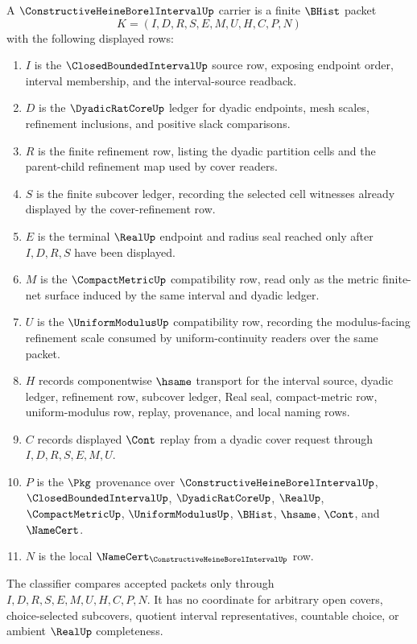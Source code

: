 \begin{definition}
\label{def:constructive-heine-borel-interval-carrier}
A $\ConstructiveHeineBorelIntervalUp$ carrier is a finite $\BHist$ packet
$$
K=(I,D,R,S,E,M,U,H,C,P,N)
$$
with the following displayed rows:
\begin{enumerate}
\item $I$ is the $\ClosedBoundedIntervalUp$ source row, exposing endpoint order, interval membership, and the interval-source readback.
\item $D$ is the $\DyadicRatCoreUp$ ledger for dyadic endpoints, mesh scales, refinement inclusions, and positive slack comparisons.
\item $R$ is the finite refinement row, listing the dyadic partition cells and the parent-child refinement map used by cover readers.
\item $S$ is the finite subcover ledger, recording the selected cell witnesses already displayed by the cover-refinement row.
\item $E$ is the terminal $\RealUp$ endpoint and radius seal reached only after $I,D,R,S$ have been displayed.
\item $M$ is the $\CompactMetricUp$ compatibility row, read only as the metric finite-net surface induced by the same interval and dyadic ledger.
\item $U$ is the $\UniformModulusUp$ compatibility row, recording the modulus-facing refinement scale consumed by uniform-continuity readers over the same packet.
\item $H$ records componentwise $\hsame$ transport for the interval source, dyadic ledger, refinement row, subcover ledger, Real seal, compact-metric row, uniform-modulus row, replay, provenance, and local naming rows.
\item $C$ records displayed $\Cont$ replay from a dyadic cover request through $I,D,R,S,E,M,U$.
\item $P$ is the $\Pkg$ provenance over $\ConstructiveHeineBorelIntervalUp$, $\ClosedBoundedIntervalUp$, $\DyadicRatCoreUp$, $\RealUp$, $\CompactMetricUp$, $\UniformModulusUp$, $\BHist$, $\hsame$, $\Cont$, and $\NameCert$.
\item $N$ is the local $\NameCert_{\ConstructiveHeineBorelIntervalUp}$ row.
\end{enumerate}
The classifier compares accepted packets only through $I,D,R,S,E,M,U,H,C,P,N$. It has no coordinate for arbitrary open covers, choice-selected subcovers, quotient interval representatives, countable choice, or ambient $\RealUp$ completeness.
\end{definition}

